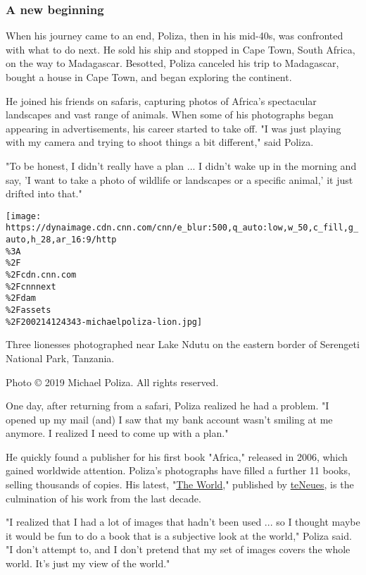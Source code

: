 \hypertarget{a-new-beginning}{%
\subsubsection{A new beginning}\label{a-new-beginning}}

When his journey came to an end, Poliza, then in his mid-40s, was
confronted with what to do next. He sold his ship and stopped in Cape
Town, South Africa, on the way to Madagascar. Besotted, Poliza canceled
his trip to Madagascar, bought a house in Cape Town, and began exploring
the continent.

He joined his friends on safaris, capturing photos of Africa's
spectacular landscapes and vast range of animals. When some of his
photographs began appearing in advertisements, his career started to
take off. "I was just playing with my camera and trying to shoot things
a bit different," said Poliza.

"To be honest, I didn't really have a plan ... I didn't wake up in the
morning and say, 'I want to take a photo of wildlife or landscapes or a
specific animal,' it just drifted into that."

\texttt{[image: https://dynaimage.cdn.cnn.com/cnn/e\_blur:500,q\_auto:low,w\_50,c\_fill,g\_auto,h\_28,ar\_16:9/http\\\%3A\\\%2F\\\%2Fcdn.cnn.com\\\%2Fcnnnext\\\%2Fdam\\\%2Fassets\\\%2F200214124343-michaelpoliza-lion.jpg]}

Three lionesses photographed near Lake Ndutu on the eastern border of
Serengeti National Park, Tanzania.

Photo © 2019 Michael Poliza. All rights reserved.

One day, after returning from a safari, Poliza realized he had a
problem. "I opened up my mail (and) I saw that my bank account wasn't
smiling at me anymore. I realized I need to come up with a plan."

He quickly found a publisher for his first book "Africa," released in
2006, which gained worldwide attention. Poliza's photographs have filled
a further 11 books, selling thousands of copies. His latest,
"\href{https://books-teneues.com/the-world-\%C2\%B7-michael-poliza/}{The
World}," published by \href{https://teneues-books.com/}{teNeues}, is the
culmination of his work from the last decade.

"I realized that I had a lot of images that hadn't been used ... so I
thought maybe it would be fun to do a book that is a subjective look at
the world," Poliza said. "I don't attempt to, and I don't pretend that
my set of images covers the whole world. It's just my view of the
world."

